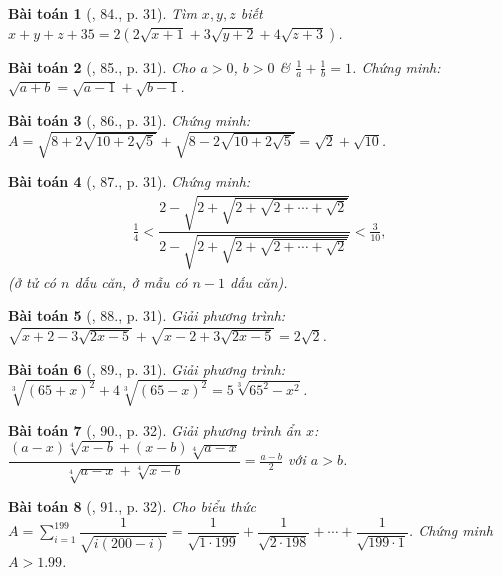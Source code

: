 \documentclass{article}
\newtheorem{baitoan}{Bài toán}
\begin{document}
\begin{baitoan}[\cite{Tuyen_Toan_9}, 84., p. 31]
	Tìm $x,y,z$ biết $x + y + z + 35 = 2(2\sqrt{x + 1} + 3\sqrt{y + 2} +4\sqrt{z + 3})$.
\end{baitoan}

\begin{baitoan}[\cite{Tuyen_Toan_9}, 85., p. 31]
	Cho $a > 0$, $b > 0$ \& $\frac{1}{a} + \frac{1}{b} = 1$. Chứng minh: $\sqrt{a + b} = \sqrt{a - 1} + \sqrt{b - 1}$.
\end{baitoan}

\begin{baitoan}[\cite{Tuyen_Toan_9}, 86., p. 31]
	Chứng minh: $A = \sqrt{8 + 2\sqrt{10 + 2\sqrt{5}}} + \sqrt{8 - 2\sqrt{10 + 2\sqrt{5}}} = \sqrt{2} + \sqrt{10}$.
\end{baitoan}

\begin{baitoan}[\cite{Tuyen_Toan_9}, 87., p. 31]
	Chứng minh:
	\begin{align*}
		\frac{1}{4} < \dfrac{2 - \sqrt{2 + \sqrt{2 + \sqrt{2 + \cdots + \sqrt{2}}}}}{2 - \sqrt{2 + \sqrt{2 + \sqrt{2 + \cdots + \sqrt{2}}}}} < \frac{3}{10},
	\end{align*}
	(ở tử có $n$ dấu căn, ở mẫu có $n - 1$ dấu căn).
\end{baitoan}

\begin{baitoan}[\cite{Tuyen_Toan_9}, 88., p. 31]
	Giải phương trình: $\sqrt{x + 2 - 3\sqrt{2x - 5}} + \sqrt{x - 2 + 3\sqrt{2x - 5}} = 2\sqrt{2}$.
\end{baitoan}

\begin{baitoan}[\cite{Tuyen_Toan_9}, 89., p. 31]
	Giải phương trình: $\sqrt[3]{(65 + x)^2} + 4\sqrt[3]{(65 - x)^2} = 5\sqrt[3]{65^2 - x^2}$.
\end{baitoan}

\begin{baitoan}[\cite{Tuyen_Toan_9}, 90., p. 32]
	Giải phương trình ẩn $x$: $\dfrac{(a - x)\sqrt[4]{x - b} + (x - b)\sqrt[4]{a - x}}{\sqrt[4]{a - x} + \sqrt[4]{x - b}} = \frac{a - b}{2}$ với $a > b$.
\end{baitoan}

\begin{baitoan}[\cite{Tuyen_Toan_9}, 91., p. 32]
	Cho biểu thức $A = \sum_{i=1}^{199} \dfrac{1}{\sqrt{i(200 - i)}} = \dfrac{1}{\sqrt{1\cdot199}} + \dfrac{1}{\sqrt{2\cdot198}} + \cdots + \dfrac{1}{\sqrt{199\cdot1}}$. Chứng minh $A > 1.99$.
\end{baitoan}
\end{document}

